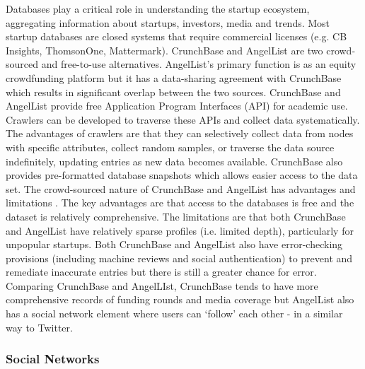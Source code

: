 \documentclass[../thesis/thesis.tex]{subfiles}
\begin{document}
Databases play a critical role in understanding the startup ecosystem, aggregating information about startups, investors, media and trends. Most startup databases are closed systems that require commercial licenses (e.g. CB Insights, ThomsonOne, Mattermark). CrunchBase and AngelList are two crowd-sourced and free-to-use alternatives. AngelList’s primary function is as an equity crowdfunding platform but it has a data-sharing agreement with CrunchBase which results in significant overlap between the two sources. CrunchBase and AngelList provide free Application Program Interfaces (API) for academic use. Crawlers can be developed to traverse these APIs and collect data systematically. The advantages of crawlers are that they can selectively collect data from nodes with specific attributes, collect random samples, or traverse the data source indefinitely, updating entries as new data becomes available. CrunchBase also provides pre-formatted database snapshots which allows easier access to the data set. The crowd-sourced nature of CrunchBase and AngelList has advantages and limitations . The key advantages are that access to the databases is free and the dataset is relatively comprehensive. The limitations are that both CrunchBase and AngelList have relatively sparse profiles (i.e. limited depth), particularly for unpopular startups. Both CrunchBase and AngelList also have error-checking provisions (including machine reviews and social authentication) to prevent and remediate inaccurate entries but there is still a greater chance for error. Comparing CrunchBase and AngelLIst, CrunchBase tends to have more comprehensive records of funding rounds \cite{cheng2016} and media coverage but AngelList also has a social network element where users can `follow’ each other - in a similar way to Twitter.

\subsubsection{Social Networks}
\end{document}
